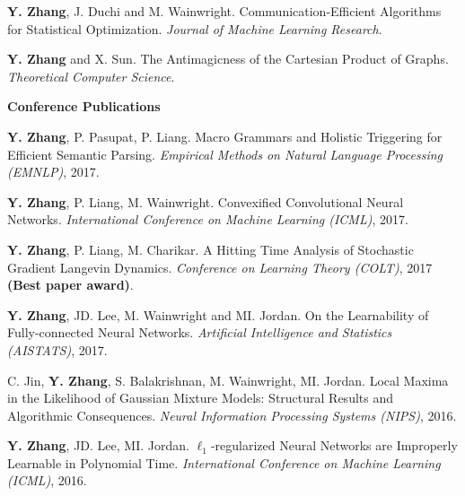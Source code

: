 \documentclass{res}
\begin{document}
\begin{resume}
\begin{enumerate}[label={[J\arabic*]}, ref={J\arabic*}]
\item \textbf{Y. Zhang}, J. Duchi and M. Wainwright. Communication-Efficient Algorithms for Statistical Optimization.
\emph{Journal of Machine Learning Research}.\label{communication-jmlr}

\item \textbf{Y. Zhang} and X. Sun. The Antimagicness of the Cartesian Product of Graphs.
\emph{Theoretical Computer Science}.\label{the-antimagicness-tcs}
\end{enumerate}

{\bf\Large Conference Publications}
\vspace{5pt}

\begin{enumerate}[label={[C\arabic*]}, ref={C\arabic*}]

\item  \textbf{Y. Zhang}, P. Pasupat, P. Liang. Macro Grammars and Holistic Triggering for Efficient Semantic Parsing.
\emph{Empirical Methods on Natural Language Processing (EMNLP)}, 2017. \label{macro-emnlp17}

\item  \textbf{Y. Zhang}, P. Liang, M. Wainwright. Convexified Convolutional Neural Networks.
\emph{International Conference on Machine Learning (ICML)}, 2017. \label{convexified-icml17}

\item  \textbf{Y. Zhang}, P. Liang, M. Charikar. A Hitting Time Analysis of Stochastic Gradient Langevin Dynamics.
\emph{Conference on Learning Theory (COLT)}, 2017 {\bf (Best paper award)}. \label{a-hitting-colt17}

\item \textbf{Y. Zhang}, JD. Lee, M. Wainwright and MI. Jordan. On the Learnability of Fully-connected Neural Networks.
\emph{Artificial Intelligence and Statistics (AISTATS)}, 2017. \label{on-the-learnability-aistats17}

\item C. Jin, {\bf Y. Zhang}, S. Balakrishnan, M. Wainwright, MI. Jordan.  
Local Maxima in the Likelihood of Gaussian Mixture Models: Structural Results and Algorithmic Consequences.
\emph{Neural Information Processing Systems (NIPS)}, 2016. \label{local-nips16}

\item \textbf{Y. Zhang}, JD. Lee, MI. Jordan. $\ell_1$-regularized Neural Networks are Improperly Learnable in Polynomial Time.
\emph{International Conference on Machine Learning (ICML)}, 2016. \label{l1-icml16}


\end{enumerate}
\end{resume}
\end{document}
